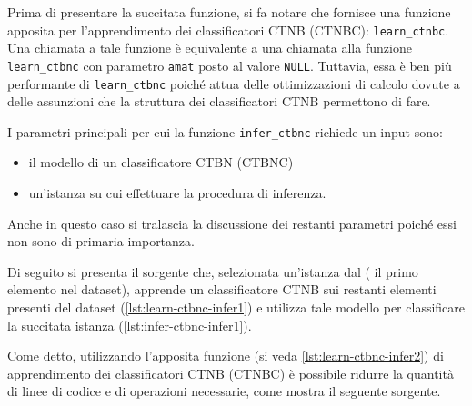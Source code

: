 Prima di presentare la succitata funzione, si fa notare che \rctbn{} fornisce una funzione apposita per l'apprendimento dei classificatori \acs{CTNB} (\acs{CTNBC}): \lstinline[language=rstats]{learn_ctnbc}. Una chiamata a tale funzione è equivalente a una chiamata alla funzione \lstinline[language=rstats]{learn_ctbnc} con parametro \lstinline$amat$ posto al valore \lstinline$NULL$. Tuttavia, essa è ben più performante di \lstinline[language=rstats]{learn_ctbnc} poiché attua delle ottimizzazioni di calcolo dovute a delle assunzioni che la struttura dei classificatori \acs{CTNB} permettono di fare.

I parametri principali per cui la funzione \lstinline[language=rstats]{infer_ctbnc} richiede un input sono:
\begin{itemize}
	\item il modello di un classificatore \acs{CTBN} (\acs{CTBNC})
	\item un'istanza su cui effettuare la procedura di inferenza.
\end{itemize}
Anche in questo caso si tralascia la discussione dei restanti parametri poiché essi non sono di primaria importanza.

Di seguito si presenta il sorgente che, selezionata un'istanza dal  (\ie{} il primo elemento nel dataset), apprende un classificatore \acs{CTNB} sui restanti elementi presenti del dataset (\autoref{lst:learn-ctbnc-infer1}) e utilizza tale modello per classificare la succitata istanza (\autoref{lst:infer-ctbnc-infer1}).

\cleardoublepage
{}

Come detto, utilizzando l'apposita funzione (si veda \autoref{lst:learn-ctbnc-infer2}) di apprendimento dei classificatori \acs{CTNB} (\acs{CTNBC}) è possibile ridurre la quantità di linee di codice e di operazioni necessarie, come mostra il seguente sorgente.

\vspace*{8pt}


